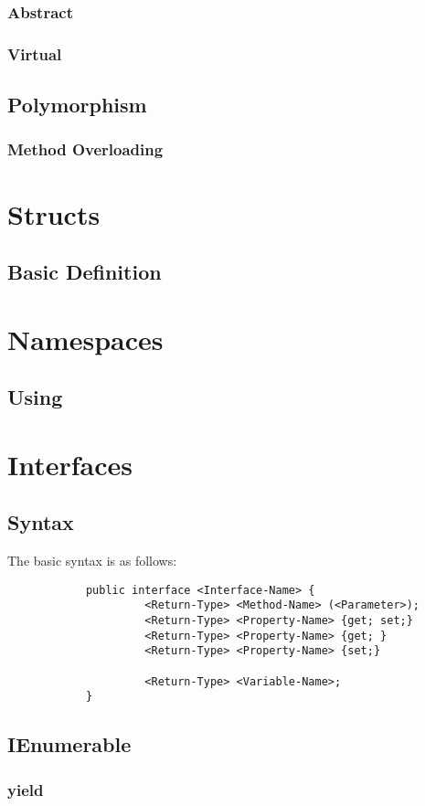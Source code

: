 \documentclass {amsart}
\begin{document}
		\subsubsection{Abstract}
		\subsubsection{Virtual}
	\subsection{Polymorphism}
		\subsubsection{Method Overloading}
\section{Structs}
	\subsection{Basic Definition}
	

\section{Namespaces}
	\subsection {Using}
\section{Interfaces}
	\subsection{Syntax} The basic syntax is as follows: 
		\begin{verbatim}
			public interface <Interface-Name> {
				     <Return-Type> <Method-Name> (<Parameter>);
				     <Return-Type> <Property-Name> {get; set;}
				     <Return-Type> <Property-Name> {get; }
				     <Return-Type> <Property-Name> {set;}

				     <Return-Type> <Variable-Name>;
			}
		\end{verbatim}
	\subsection{IEnumerable}
		\subsubsection {yield}
\end{document}
